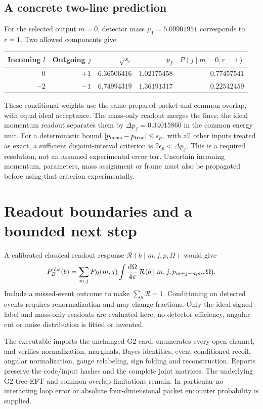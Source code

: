 \documentclass[11pt,a4paper]{article}
\newcommand{\dd}{\mathrm d}
\begin{document}
\subsection*{A concrete two-line prediction}
For the selected output $m=0$, detector mass $\mu_1=5.09901951$
corresponds to $r=1$. Two allowed components give
\begin{center}
\begin{tabular}{rrrrr}
\toprule
Incoming $l$ & Outgoing $j$ & $\sqrt{s_l}$ & $p_f$ & $P(j\mid m=0,r=1)$\\
\midrule
$0$ & $+1$ & $6.36506416$ & $1.02175458$ & $0.77457541$\\
$-2$ & $-1$ & $6.74994319$ & $1.36191317$ & $0.22542459$\\
\bottomrule
\end{tabular}
\end{center}
These conditional weights use the same prepared packet and common
overlap, with equal ideal acceptance. The mass-only readout merges
the lines; the ideal momentum readout
separates them by $\Delta p_f=0.34015860$ in the common energy unit.
For a deterministic bound $|p_{\rm meas}-p_{\rm true}|\leq\epsilon_p$,
with all other inputs treated as exact, a sufficient disjoint-interval
criterion is $2\epsilon_p<\Delta p_f$. This is a required resolution,
not an assumed experimental error bar. Uncertain incoming momentum,
parameters, mass assignment or frame must also be propagated before
using that criterion experimentally.

\section{Readout boundaries and a bounded next step}
A calibrated classical readout response
$\mathcal R(b\mid m,j,p,\Omega)$ would give
\begin{equation}
 P_B^{\rm obs}(b)=\sum_{m,j}P_B(m,j)
 \int\frac{\dd\Omega}{4\pi}\,
 \mathcal R(b\mid m,j,p_{m+j-n,m},\Omega).
\end{equation}
Include a missed-event outcome to make $\sum_b\mathcal R=1$.
Conditioning on detected events requires renormalization and may
change fractions. Only the ideal signed-label and mass-only readouts
are evaluated here; no detector efficiency, angular cut or noise
distribution is fitted or invented.

The executable imports the unchanged G2 card, enumerates every open
channel, and verifies normalization, marginals, Bayes identities,
event-conditioned recoil, angular normalization, gauge relabeling,
sign folding and reconstruction. Reports preserve the code/input
hashes and the complete joint matrices. The underlying G2 tree-EFT
and common-overlap limitations remain. In particular no interacting
loop error or absolute four-dimensional packet encounter probability
is supplied.
\end{document}
